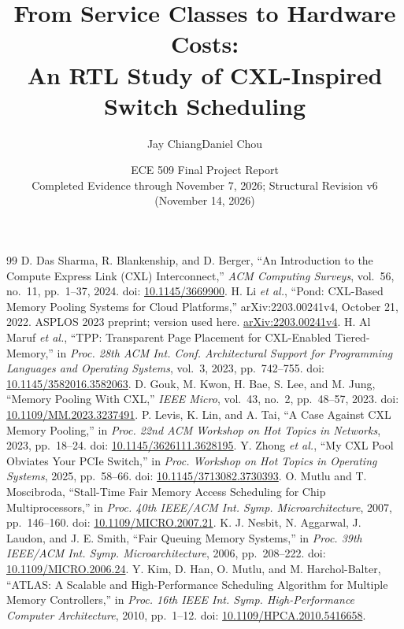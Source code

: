 \documentclass[10pt,letterpaper,twocolumn]{article}
\title{\vspace{-2em}\bfseries From Service Classes to Hardware Costs:\\ An RTL Study of CXL-Inspired Switch Scheduling}
\author{Jay Chiang\qquad Daniel Chou}
\date{\normalsize ECE 509 Final Project Report\\\small Completed Evidence through November 7, 2026; Structural Revision v6 (November 14, 2026)}
\begin{document}
\maketitle

\clearpage

\begingroup\footnotesize\balance
\begin{thebibliography}{99}
 D. Das Sharma, R. Blankenship, and D. Berger, ``An Introduction to the Compute Express Link (CXL) Interconnect,'' \emph{ACM Computing Surveys}, vol.~56, no.~11, pp.~1--37, 2024. doi: \href{https://doi.org/10.1145/3669900}{10.1145/3669900}.
 H. Li \emph{et al.}, ``Pond: CXL-Based Memory Pooling Systems for Cloud Platforms,'' arXiv:2203.00241v4, October 21, 2022. ASPLOS 2023 preprint; version used here. \href{https://arxiv.org/abs/2203.00241v4}{arXiv:2203.00241v4}.
 H. Al Maruf \emph{et al.}, ``TPP: Transparent Page Placement for CXL-Enabled Tiered-Memory,'' in \emph{Proc. 28th ACM Int. Conf. Architectural Support for Programming Languages and Operating Systems}, vol.~3, 2023, pp.~742--755. doi: \href{https://doi.org/10.1145/3582016.3582063}{10.1145/3582016.3582063}.
 D. Gouk, M. Kwon, H. Bae, S. Lee, and M. Jung, ``Memory Pooling With CXL,'' \emph{IEEE Micro}, vol.~43, no.~2, pp.~48--57, 2023. doi: \href{https://doi.org/10.1109/MM.2023.3237491}{10.1109/MM.2023.3237491}.
 P. Levis, K. Lin, and A. Tai, ``A Case Against CXL Memory Pooling,'' in \emph{Proc. 22nd ACM Workshop on Hot Topics in Networks}, 2023, pp.~18--24. doi: \href{https://doi.org/10.1145/3626111.3628195}{10.1145/3626111.3628195}.
 Y. Zhong \emph{et al.}, ``My CXL Pool Obviates Your PCIe Switch,'' in \emph{Proc. Workshop on Hot Topics in Operating Systems}, 2025, pp.~58--66. doi: \href{https://doi.org/10.1145/3713082.3730393}{10.1145/3713082.3730393}.
 O. Mutlu and T. Moscibroda, ``Stall-Time Fair Memory Access Scheduling for Chip Multiprocessors,'' in \emph{Proc. 40th IEEE/ACM Int. Symp. Microarchitecture}, 2007, pp.~146--160. doi: \href{https://doi.org/10.1109/MICRO.2007.21}{10.1109/MICRO.2007.21}.
 K. J. Nesbit, N. Aggarwal, J. Laudon, and J. E. Smith, ``Fair Queuing Memory Systems,'' in \emph{Proc. 39th IEEE/ACM Int. Symp. Microarchitecture}, 2006, pp.~208--222. doi: \href{https://doi.org/10.1109/MICRO.2006.24}{10.1109/MICRO.2006.24}.
 Y. Kim, D. Han, O. Mutlu, and M. Harchol-Balter, ``ATLAS: A Scalable and High-Performance Scheduling Algorithm for Multiple Memory Controllers,'' in \emph{Proc. 16th IEEE Int. Symp. High-Performance Computer Architecture}, 2010, pp.~1--12. doi: \href{https://doi.org/10.1109/HPCA.2010.5416658}{10.1109/HPCA.2010.5416658}.

\end{thebibliography}
\end{document}
